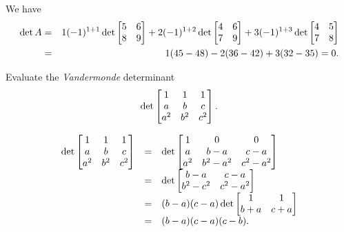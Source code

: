 \begin{solu}We have \begin{eqnarray*}\det A  & = & 1(-1)^{1 + 1}\det
\begin{bmatrix} 5 & 6 \cr 8 & 9 \end{bmatrix} + 2(-1)^{1 + 2}\det
\begin{bmatrix} 4 & 6 \cr 7 & 9 \end{bmatrix} + 3(-1)^{1 + 3}\det
\begin{bmatrix} 4 & 5 \cr 7 & 8 \end{bmatrix} \\ &  =  & 1(45 - 48) - 2(36
- 42) + 3(32 - 35 ) = 0. \end{eqnarray*}
\end{solu}

\begin{exa}
 Evaluate the {\em Vandermonde} determinant
 $$\det\begin{bmatrix}1 & 1 & 1 \cr a & b & c \cr a^2 & b^2 & c^2 \cr
 \end{bmatrix}.$$\end{exa}
 \begin{solu}$$\begin{array}{lll}\det\begin{bmatrix}1 & 1 & 1 \cr a & b & c \cr a^2 & b^2 & c^2 \cr \end{bmatrix}
 & = & \det\begin{bmatrix}1 & 0
 & 0 \cr a & b - a & c - a \cr a^2 & b^2 - a^2 & c^2 - a^2\cr \end{bmatrix} \\
 & = & \det \begin{bmatrix}b - a & c - a \cr b^2 - c^2 & c^2 - a^2 \end{bmatrix} \\ &
 = & (b - a)(c - a) \det\begin{bmatrix}1 & 1 \cr b + a & c + a \end{bmatrix} \\ &  = &
 (b - a)(c - a)(c - b).
 \end{array}$$
\end{solu}
